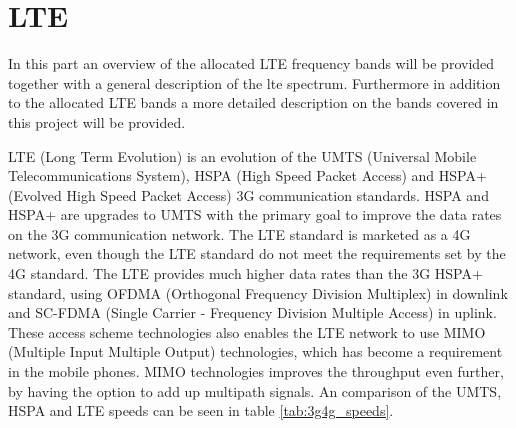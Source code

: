 \section{LTE}
\label{sec:lte}
In this part an overview of the allocated LTE frequency bands will be provided together with a general description of the lte spectrum.
Furthermore in addition to the allocated LTE bands a more detailed description on the bands covered in this project will be provided.

LTE (Long Term Evolution) is an evolution of the UMTS (Universal Mobile Telecommunications System), HSPA (High Speed Packet Access) and HSPA+ (Evolved High Speed Packet Access) 3G communication standards. HSPA and HSPA+ are upgrades to UMTS with the primary goal to improve the data rates on the 3G communication network. The LTE standard is marketed as a 4G network, even though the LTE standard do not meet the requirements set by the 4G standard.
The LTE provides much higher data rates than the 3G HSPA+ standard, using OFDMA (Orthogonal Frequency Division Multiplex) in downlink and SC-FDMA (Single Carrier - Frequency Division Multiple Access) in uplink. These access scheme technologies also enables the LTE network to use MIMO (Multiple Input Multiple Output) technologies, which has become a requirement in the mobile phones.
MIMO technologies improves the throughput even further, by having the option to add up multipath signals. An comparison of the UMTS, HSPA and LTE speeds can be seen in table \ref{tab:3g4g_speeds}. \cite{radio2015electronics} 

